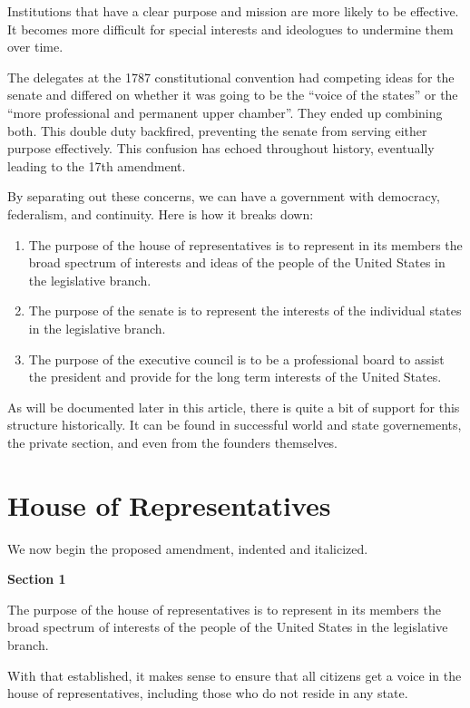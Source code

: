 \documentclass{article}
\begin{document}
Institutions that have a clear purpose and mission are more likely to be effective. It becomes more difficult for special interests and ideologues to undermine them over time.

The delegates at the 1787 constitutional convention had competing ideas for the senate and differed on whether it was going to be the “voice of the states” or the “more professional and permanent upper chamber”. They ended up combining both. This double duty backfired, preventing the senate from serving either purpose effectively. This confusion has echoed throughout history, eventually leading to the 17th amendment.

By separating out these concerns, we can have a government with democracy, federalism, and continuity. Here is how it breaks down:
\begin{enumerate}[I]
\item The purpose of the house of representatives is to represent in its members the broad spectrum of interests and ideas of the people of the United States in the legislative branch.
\item The purpose of the senate is to represent the interests of the individual states in the legislative branch.
\item The purpose of the executive council is to be a professional board to assist the president and provide for the long term interests of the United States.
\end{enumerate}

As will be documented later in this article, there is quite a bit of support for this structure historically. It can be found in successful world and state governements, the private section, and even from the founders themselves.

\section{House of Representatives}

We now begin the proposed amendment, indented and italicized.

\begin{quoting}
\textbf{Section 1}

The purpose of the house of representatives is to represent in its members the broad spectrum of interests of the people of the United States in the legislative branch.
\end{quoting}

With that established, it makes sense to ensure that all citizens get a voice in the house of representatives, including those who do not reside in any state.
\end{document}
